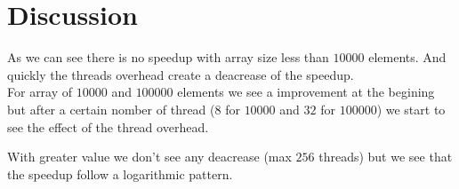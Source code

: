 \section{Discussion}

As we can see there is no speedup with array size less than $10000$ elements. And quickly the threads overhead create a deacrease of the speedup.\\

For array of $10000$ and $100000$ elements we see a improvement at the begining but after a certain nomber of thread ($8$ for $10000$ and $32$ for $100000$) we start to see the effect of the thread overhead.

With greater value we don't see any deacrease (max $256$ threads) but we see that the speedup follow a logarithmic pattern.
